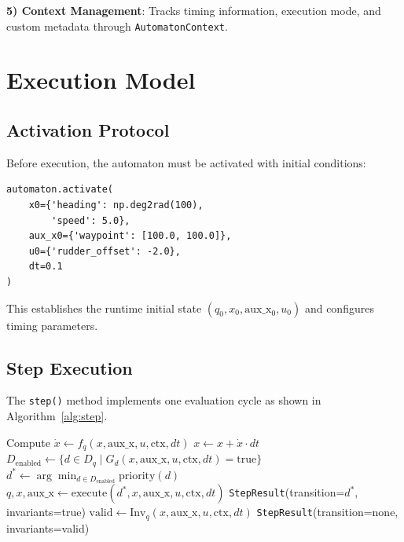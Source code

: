 \documentclass[conference]{IEEEtran}
\begin{document}
\textbf{5) Context Management}: Tracks timing information, execution mode, and custom metadata through \texttt{AutomatonContext}.

\section{Execution Model}

\subsection{Activation Protocol}

Before execution, the automaton must be activated with initial conditions:

\begin{lstlisting}[caption={Automaton Activation}]
automaton.activate(
    x0={'heading': np.deg2rad(100), 
        'speed': 5.0},
    aux_x0={'waypoint': [100.0, 100.0]},
    u0={'rudder_offset': -2.0},
    dt=0.1
)
\end{lstlisting}

This establishes the runtime initial state $(q_0, x_0, \text{aux\_x}_0, u_0)$ and configures timing parameters.

\subsection{Step Execution}

The \texttt{step()} method implements one evaluation cycle as shown in Algorithm~\ref{alg:step}.

\begin{algorithm}
\caption{Hybrid Automaton Step}
\label{alg:step}
\begin{algorithmic}[1]
\STATE Compute $\dot{x} \leftarrow f_q(x, \text{aux\_x}, u, \text{ctx}, dt)$
    \STATE $x \leftarrow x + \dot{x} \cdot dt$ 
\ENDIF
\STATE $D_{\text{enabled}} \leftarrow \{d \in D_q \mid G_d(x, \text{aux\_x}, u, \text{ctx}, dt) = \text{true}\}$
    \STATE $d^* \leftarrow \arg\min_{d \in D_{\text{enabled}}} \text{priority}(d)$
    \STATE $q, x, \text{aux\_x} \leftarrow \text{execute}(d^*, x, \text{aux\_x}, u, \text{ctx}, dt)$
    \RETURN \texttt{StepResult}(transition=$d^*$, invariants=true)
\ELSE
    \STATE $\text{valid} \leftarrow \text{Inv}_q(x, \text{aux\_x}, u, \text{ctx}, dt)$
    \RETURN \texttt{StepResult}(transition=none, invariants=valid)
\ENDIF
\end{algorithmic}
\end{algorithm}
\end{document}
